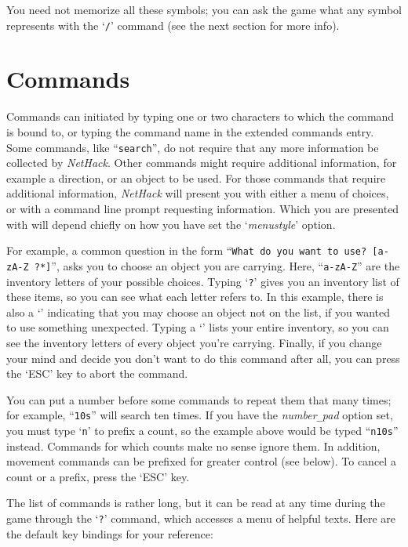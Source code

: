 \elist
You need not memorize all these symbols; you can ask the game what any
symbol represents with the `{\tt /}' command (see the next section for
more info).

\section{Commands}

Commands can initiated by typing one or two characters to which
the command is bound to, or typing the command name in the extended
commands entry.  Some commands,
like ``{\tt search}'', do not require that any more information be collected
by {\it NetHack\/}.  Other commands might require additional information, for
example a direction, or an object to be used.  For those commands that
require additional information, {\it NetHack\/} will present you with either 
a menu of choices, or with a command line prompt requesting information.  Which
you are presented with will depend chiefly on how you have set the
`{\it menustyle\/}'
option.

For example, a common question in the form ``{\tt What do you want to
use? [a-zA-Z\ ?*]}'', asks you to choose an object you are carrying.
Here, ``{\tt a-zA-Z}'' are the inventory letters of your possible choices.
Typing `{\tt ?}' gives you an inventory list of these items, so you can see
what each letter refers to.  In this example, there is also a `{\tt *}'
indicating that you may choose an object not on the list, if you
wanted to use something unexpected.  Typing a `{\tt *}' lists your entire
inventory, so you can see the inventory letters of every object you're
carrying.  Finally, if you change your mind and decide you don't want
to do this command after all, you can press the `ESC' key to abort the
command.

You can put a number before some commands to repeat them that many
times; for example, ``{\tt 10s}'' will search ten times.  If you have the
{\it number\verb+_+pad\/}
option set, you must type `{\tt n}' to prefix a count, so the example above
would be typed ``{\tt n10s}'' instead.  Commands for which counts make no
sense ignore them.  In addition, movement commands can be prefixed for
greater control (see below).  To cancel a count or a prefix, press the
`ESC' key.

The list of commands is rather long, but it can be read at any time
during the game through the `{\tt ?}' command, which accesses a menu of
helpful texts.  Here are the default key bindings for your reference:

